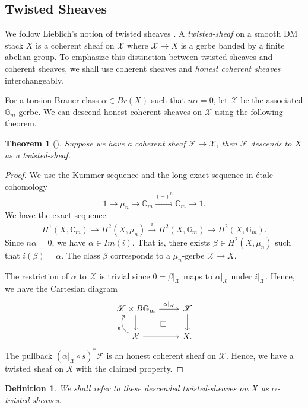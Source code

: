 \documentclass[11pt]{amsart}
\newtheorem{theorem}{Theorem}[section]
\newtheorem{definition}{Definition}[subsection]
\theoremstyle{definition}
\newcommand{\ri}{\rightarrow}
\newcommand{\gm}{\mathbb{G}_m}
\begin{document}
\subsection{Twisted Sheaves}\label{sec:twisted}
We follow Lieblich's notion of twisted sheaves \cite{lieblich-main}.  A \textit{twisted-sheaf} on a smooth DM stack $X$ is a coherent sheaf on $\mathcal{X}$ where 
$\mathcal{X}\ri X$ is a gerbe banded by a finite abelian group. To emphasize this distinction between twisted sheaves and coherent sheaves, we shall use  coherent sheaves and \textit{honest coherent sheaves} interchangeably. 

For a torsion Brauer class $\alpha\in Br(X)$ such that $n\alpha = 0$, let $\mathscr{X}$ be the associated $\gm$-gerbe. We can descend honest coherent sheaves on $\mathscr{X}$ using the following theorem.
\begin{theorem}[\cite{lieblich-main}]\label{thm:twisted}
    Suppose we have a coherent sheaf $\mathcal{F}\ri \mathscr{X}$, then $\mathcal{F}$ descends to $X$ as a twisted-sheaf.
\end{theorem}
\begin{proof}
We use the Kummer sequence and the long exact sequence in \'etale cohomology
$$1\ri \mu_n\ri \gm\xrightarrow{(-)^n}\gm\ri 1.$$
We have the exact sequence $$H^1(X,\gm)\ri H^2(X,\mu_n)\xrightarrow{i} H^2(X,\gm)\ri H^2(X,\gm).$$
Since $n\alpha=0$, we have $\alpha\in Im(i)$. That is, there exists $ \beta\in H^2(X,\mu_n)$ such that $i(\beta)=\alpha$. The class $\beta$ corresponds to a $\mu_n$-gerbe $\mathcal{X}\ri X$. 

The restriction of $\alpha$ to $\mathcal{X}$ is trivial \cite[Theorem 1.2]{min-shen} since $0= \beta|_{\mathcal{X}}$ maps to $\alpha|_{\mathcal{X}}$ under $i|_{\mathcal{X}}$. Hence, we have the Cartesian diagram
$$\begin{tikzcd}
    \mathscr{X}\times B\gm \ar[r,"\alpha|_{\mathcal{X}}"]\ar[d]\ar[dr, phantom, "\square"]&\mathscr{X}\ar[d]\\
    \mathcal{X}\ar[r]\ar[u, "s", bend left = 60]&X.
\end{tikzcd}$$
The pullback $(\alpha|_{\mathcal{X}}\circ s)^*\mathcal{F}$ is an honest coherent sheaf on $\mathcal{X}$.
Hence, we have a twisted sheaf on $X$ with the claimed property.
\end{proof}
\begin{definition}
    We shall refer to these descended twisted-sheaves on $X$ as $\alpha$-twisted sheaves.
\end{definition}
\end{document}
